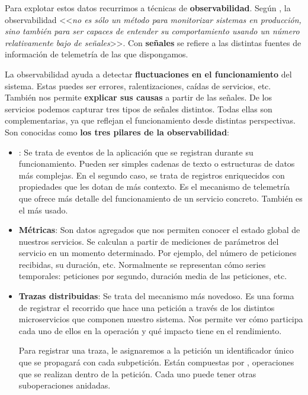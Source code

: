 Para explotar estos datos recurrimos a técnicas de \textbf{observabilidad}. Según \cite{parkerDistributedTracingPractice2020}, la observabilidad <<\emph{no es sólo un método para monitorizar sistemas en producción, sino también para ser capaces de entender su comportamiento usando un número relativamente bajo de señales}>>. Con \textbf{señales} se refiere a las distintas fuentes de información de telemetría de las que dispongamos.

La observabilidad ayuda a detectar \textbf{fluctuaciones en el funcionamiento} del sistema. Estas puedes ser errores, ralentizaciones, caídas de servicios, etc. También nos permite \textbf{explicar sus causas} a partir de las señales. De los servicios podemos capturar tres tipos de señales distintos. Todas ellas son complementarias, ya que reflejan el funcionamiento desde distintas perspectivas. Son conocidas como \textbf{los tres pilares de la observabilidad}:

\begin{itemize}
  \item \textbf{}: Se trata de eventos de la aplicación que se registran durante su funcionamiento. Pueden ser simples cadenas de texto o estructuras de datos más complejas. En el segundo caso, se trata de registros enriquecidos con propiedades que les dotan de más contexto. Es el mecanismo de telemetría que ofrece más detalle del funcionamiento de un servicio concreto. También es el más usado.

  \item \textbf{Métricas}: Son datos agregados que nos permiten conocer el estado global de nuestros servicios. \cite{opentelemetryOpenTelemetryDocumentation2022} Se calculan a partir de mediciones de parámetros del servicio en un momento determinado. Por ejemplo, del número de peticiones recibidas, su duración, etc. Normalmente se representan cómo series temporales: peticiones por segundo, duración media de las peticiones, etc.

  \item \textbf{Trazas distribuidas}: Se trata del mecanismo más novedoso. Es una forma de registrar el recorrido que hace una petición a través de los distintos microservicios que componen nuestro sistema. Nos permite ver cómo participa cada uno de ellos en la operación y qué impacto tiene en el rendimiento. \cite{parkerDistributedTracingPractice2020}

  Para registrar una traza, le asignaremos a la petición un identificador único que se propagará con cada subpetición. Están compuestas por , operaciones que se realizan dentro de la petición. Cada uno puede tener otras suboperaciones anidadas. \cite{opentelemetryOpenTelemetryDocumentation2022}
\end{itemize}

